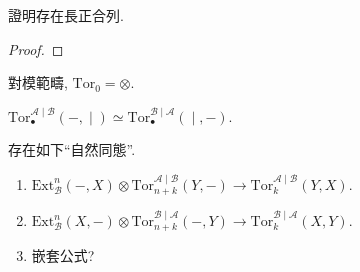 \begin{proposition}
    證明存在長正合列. 
    \begin{proof}
    \end{proof}
\end{proposition}

\begin{example}
    對模範疇, $\mathrm{Tor}_0 = ⊗$. 
\end{example}

\begin{proposition}[對稱定理]
    $\mathrm{Tor}^{𝒜 ∣ ℬ}_∙(−, ∣) ≃ \mathrm{Tor}^{ℬ ∣ 𝒜}_∙(∣, −)$.
\end{proposition}

\begin{proposition}[對消公式]
    存在如下``自然同態''. 
    \begin{enumerate}
        \item $\mathrm{Ext}_{ℬ}^n(-, X) ⊗ \mathrm{Tor}^{𝒜 ∣ ℬ}_{n+k}(Y,-) → \mathrm{Tor}^{𝒜 ∣ ℬ}_{k}(Y,X)$. 
        \item $\mathrm{Ext}_{ℬ}^n(X, -) ⊗ \mathrm{Tor}^{ℬ ∣ 𝒜}_{n+k}(-, Y) → \mathrm{Tor}^{ℬ ∣ 𝒜}_{k}(X, Y)$.
        \item 嵌套公式? 
    \end{enumerate}
\end{proposition}












